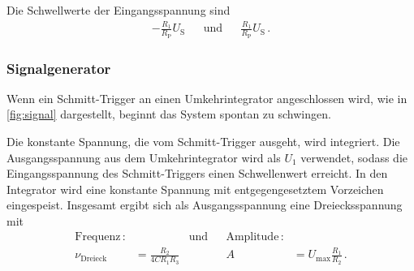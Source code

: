Die Schwellwerte der Eingangsspannung sind 
\begin{align*}
    - \frac{R_1}{R_\text{P}} U_\text{S} && \text{und} && \frac{R_1}{R_\text{P}} U_\text{S} \, .
\end{align*}

\subsubsection{Signalgenerator}

\noindent 
Wenn ein Schmitt-Trigger an einen Umkehrintegrator angeschlossen wird, wie in \autoref{fig:signal} dargestellt, beginnt das System spontan zu schwingen. 


\noindent
Die konstante Spannung, die vom Schmitt-Trigger ausgeht, wird integriert. Die Ausgangsspannung aus dem Umkehrintegrator wird als $U_1$ verwendet, sodass die Eingangsspannung des Schmitt-Triggers einen Schwellenwert erreicht. In den Integrator wird eine konstante Spannung mit entgegengesetztem Vorzeichen eingespeist. Insgesamt ergibt sich als Ausgangsspannung eine Dreiecksspannung mit 
\begin{align*}
    \text{Frequenz}\, : & & \text{und} & & \text{Amplitude}\, :& \\
    \nu_\text{Dreieck} &= \frac{R_2}{4 C R_1 R_3} & & &A &=  U_\text{max} \frac{R_1}{R_2} \, .
\end{align*}